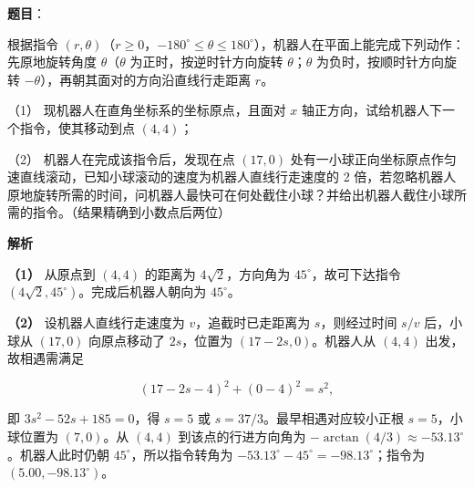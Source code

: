 \begin{answer}

\textbf{题目}：

根据指令 $(r,\theta)$（$r\ge0$，$-180^\circ\le\theta\le180^\circ$），机器人在平面上能完成下列动作：先原地旋转角度 $\theta$（$\theta$ 为正时，按逆时针方向旋转 $\theta$；$\theta$ 为负时，按顺时针方向旋转 $-\theta$），再朝其面对的方向沿直线行走距离 $r$。

（1） 现机器人在直角坐标系的坐标原点，且面对 $x$ 轴正方向，试给机器人下一个指令，使其移动到点 $(4,4)$；

（2） 机器人在完成该指令后，发现在点 $(17,0)$ 处有一小球正向坐标原点作匀速直线滚动，已知小球滚动的速度为机器人直线行走速度的 2 倍，若忽略机器人原地旋转所需的时间，问机器人最快可在何处截住小球？并给出机器人截住小球所需的指令。（结果精确到小数点后两位）
\nopagebreak[4]
\begin{center}\end{center}
\nopagebreak[4]
\textbf{解析}

\textbf{（1）} 从原点到 $(4,4)$ 的距离为 $4\sqrt2$，方向角为 $45^\circ$，故可下达指令 $(4\sqrt2,45^\circ)$。完成后机器人朝向为 $45^\circ$。

\textbf{（2）} 设机器人直线行走速度为 $v$，追截时已走距离为 $s$，则经过时间 $s/v$ 后，小球从 $(17,0)$ 向原点移动了 $2s$，位置为 $(17-2s,0)$。机器人从 $(4,4)$ 出发，故相遇需满足

\nopagebreak[4]
\[
(17-2s-4)^2+(0-4)^2=s^2,
\]

即 $3s^2-52s+185=0$，得 $s=5$ 或 $s=37/3$。最早相遇对应较小正根 $s=5$，小球位置为 $(7,0)$。从 $(4,4)$ 到该点的行进方向角为 $-\arctan(4/3)\approx-53.13^\circ$。机器人此时仍朝 $45^\circ$，所以指令转角为 $-53.13^\circ-45^\circ=-98.13^\circ$；指令为 $(5.00,-98.13^\circ)$。



\end{answer}
